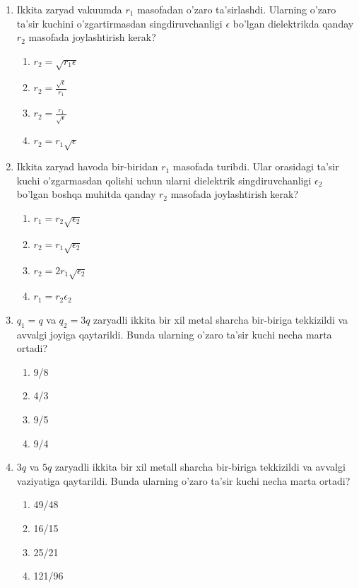 \begin{enumerate}
\item Ikkita zaryad vakuumda $r_1$ masofadan o'zaro ta'sirlashdi. Ularning o'zaro ta'sir kuchini o'zgartirmasdan singdiruvchanligi $\epsilon$ bo'lgan dielektrikda qanday $r_2$ masofada joylashtirish kerak?
\begin{enumerate}[label=\Alph*)]
\item $r_2 = \sqrt{r_1 \epsilon}$
\item $r_2 = \frac{\sqrt{\epsilon}}{r_1}$
\item $r_2 = \frac{r_1}{\sqrt{\epsilon}}$
\item $r_2 = r_1 \sqrt{\epsilon}$
\end{enumerate}

\item Ikkita zaryad havoda bir-biridan $r_1$ masofada turibdi. Ular orasidagi ta'sir kuchi o'zgarmasdan qolishi uchun ularni dielektrik singdiruvchanligi $\epsilon_2$ bo'lgan boshqa muhitda qanday $r_2$ masofada joylashtirish kerak?
\begin{enumerate}[label=\Alph*)]
\item $r_1 = r_2 \sqrt{\epsilon_2}$
\item $r_2 = r_1 \sqrt{\epsilon_2}$
\item $r_2 = 2r_1 \sqrt{\epsilon_2}$
\item $r_1 = r_2 \epsilon_2$
\end{enumerate}

\item $q_1 = q$ va $q_2 = 3q$ zaryadli ikkita bir xil metal sharcha bir-biriga tekkizildi va avvalgi joyiga qaytarildi. Bunda ularning o'zaro ta'sir kuchi necha marta ortadi?
\begin{enumerate}[label=\Alph*)]
\item 9/8
\item 4/3
\item 9/5
\item 9/4
\end{enumerate}

\item $3q$ va $5q$ zaryadli ikkita bir xil metall sharcha bir-biriga tekkizildi va avvalgi vaziyatiga qaytarildi. Bunda ularning o'zaro ta'sir kuchi necha marta ortadi?
\begin{enumerate}[label=\Alph*)]
\item 49/48
\item 16/15
\item 25/21
\item 121/96
\end{enumerate}


\end{enumerate}
